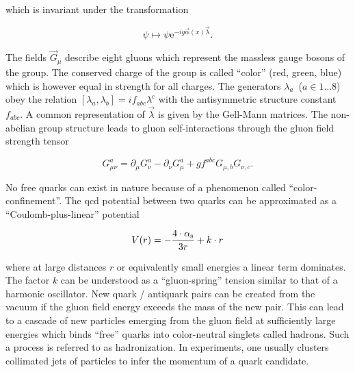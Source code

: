 which is invariant under the transformation

\begin{equation}
\psi\mapsto\psi\mathrm{e}^{-ig\vec{\alpha}(x)\vec{\lambda}}.
\end{equation}

The fields $\vec{G}_\mu$ describe eight gluons which represent the massless gauge bosons of the group. The conserved charge of the group is called ``color'' (red, green, blue) which is however equal in strength for all charges. The generators $\lambda_a$~($a\in{1\ldots8}$) obey the relation $[\lambda_a,\lambda_b]=if_{abc}\lambda^c$ with the antisymmetric structure constant $f_{abc}$. A common representation of $\vec{\lambda}$ is given by the Gell-Mann matrices. The non-abelian group structure leads to gluon self-interactions through the gluon field strength tensor

\begin{equation}
G_{\mu\nu}^{a}=\partial_{\mu} G_\nu^{a}-\partial_{\nu} G_{\mu}^{a}+gf^{abc}G_{\mu,b}G_{\nu,c}.
\end{equation}

No free quarks can exist in nature because of a phenomenon called ``color-confinement''. The \gls{qcd} potential between two quarks can be approximated as a ``Coulomb-plus-linear'' potential~\cite{Sumino2003173}

\begin{equation}
V(r)=-\frac{4\cdot{\alpha_\mathrm{s}}}{3r}+k\cdot r
\end{equation}

where at large distances $r$ or equivalently small energies a linear term dominates. The factor $k$ can be understood as a ``gluon-spring'' tension similar to that of a harmonic oscillator. New quark / antiquark pairs can be created from the vacuum if the gluon field energy exceeds the mass of the new pair. This can lead to a cascade of new particles emerging from the gluon field at sufficiently large energies which binds ``free'' quarks into color-neutral singlets called hadrons. Such a process is referred to as hadronization. In experiments, one usually clusters collimated jets of particles to infer the momentum of a quark candidate.

